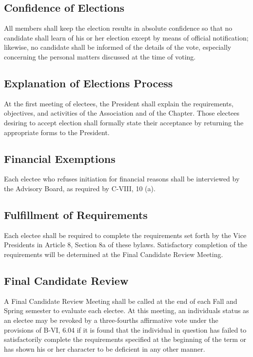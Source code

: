 \documentclass{article}
\begin{document}
	\subsection{Confidence of Elections}
	All members shall keep the election results in absolute confidence so that no candidate shall learn of his or her election except by means of official notification; likewise, no candidate shall be informed of the details of the vote, especially concerning the personal matters discussed at the time of voting.
	
	\subsection{Explanation of Elections Process}
	At the first meeting of electees, the President shall explain the requirements, objectives, and activities of the Association and of the Chapter. Those electees desiring to accept election shall formally state their acceptance by returning the appropriate forms to the President.
	
	\subsection{Financial Exemptions}
	Each electee who refuses initiation for financial reasons shall be interviewed by the Advisory Board, as required by C-VIII, 10 (a).
	
	\subsection{Fulfillment of Requirements}
	Each electee shall be required to complete the requirements set forth by the Vice Presidents in Article 8, Section 8a of these bylaws. Satisfactory completion of the requirements will be determined at the Final Candidate Review Meeting.
	
	\subsection{Final Candidate Review}
	A Final Candidate Review Meeting shall be called at the end of each Fall and Spring semester to evaluate each electee. At this meeting, an individual\textquotesingle s status as an electee may be revoked by a three-fourths affirmative vote under the provisions of B-VI, 6.04 if it is found that the individual in question has failed to satisfactorily complete the requirements specified at the beginning of the term or has shown his or her character to be deficient in any other manner.
	
\end{document}
